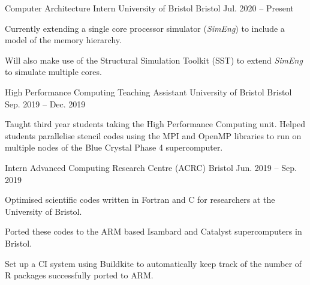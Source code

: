 \vspace{-1.1em}


\vspace{-0.2em}

\begin{cventries}

  \cventry
    {Computer Architecture Intern} %
    {University of Bristol} %
    {Bristol} %
    {Jul. 2020 -- Present} %
    {
      \begin{cvitems} %
        \item {Currently extending a single core processor simulator (\textit{SimEng}) to include a model of the memory hierarchy.}
        \item {Will also make use of the Structural Simulation Toolkit (SST) to extend \textit{SimEng} to simulate multiple cores.}
      \end{cvitems}
    }

  \cventry
    {High Performance Computing Teaching Assistant} %
    {University of Bristol} %
    {Bristol} %
    {Sep. 2019 -- Dec. 2019} %
    {
      \begin{cvitems} %
        \item {Taught third year students taking the High Performance Computing unit. Helped students parallelise stencil codes using the MPI and OpenMP libraries to run on multiple nodes of the Blue Crystal Phase 4 supercomputer.}
      \end{cvitems}
    }

  \cventry
    {Intern} %
    {Advanced Computing Research Centre (ACRC)} %
    {Bristol} %
    {Jun. 2019 -- Sep. 2019} %
    {
      \begin{cvitems} %
        \item {Optimised scientific codes written in Fortran and C for researchers at the University of Bristol.}
        \item {Ported these codes to the ARM based Isambard and Catalyst supercomputers in Bristol.}
        \item {Set up a CI system using Buildkite to automatically keep track of the number of R packages successfully ported to ARM.}
      \end{cvitems}
    }

\end{cventries}
